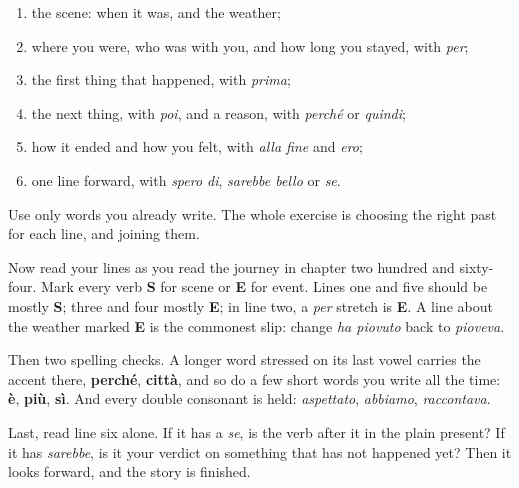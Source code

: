 \begin{enumerate}
\raggedright
  \item the scene: when it was, and the weather;
  \item where you were, who was with you, and how long you stayed, with \emph{per};
  \item the first thing that happened, with \emph{prima};
  \item the next thing, with \emph{poi}, and a reason, with \emph{perché} or \emph{quindi};
  \item how it ended and how you felt, with \emph{alla fine} and \emph{ero};
  \item one line forward, with \emph{spero di}, \emph{sarebbe bello} or \emph{se}.
\end{enumerate}

Use only words you already write. The whole exercise is choosing the right past for each line, and joining them.

\begin{tcolorbox}[breakable,colback=teal!4,colframe=teal!35!black,title={Before you move on}]
Now read your lines as you read the journey in chapter two hundred and sixty-four. Mark every verb \textbf{S} for scene or \textbf{E} for event. Lines one and five should be mostly \textbf{S}; three and four mostly \textbf{E}; in line two, a \emph{per} stretch is \textbf{E}. A line about the weather marked \textbf{E} is the commonest slip: change \emph{ha piovuto} back to \emph{pioveva}.

Then two spelling checks. A longer word stressed on its last vowel carries the accent there, \textbf{perché}, \textbf{città}, and so do a few short words you write all the time: \textbf{è}, \textbf{più}, \textbf{sì}. And every double consonant is held: \emph{aspettato}, \emph{abbiamo}, \emph{raccontava}.

Last, read line six alone. If it has a \emph{se}, is the verb after it in the plain present? If it has \emph{sarebbe}, is it your verdict on something that has not happened yet? Then it looks forward, and the story is finished.
\end{tcolorbox}
